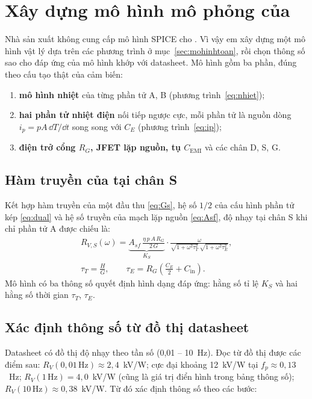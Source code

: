 \section{Xây dựng mô hình mô phỏng của \PYD{}}
\label{sec:mohinh}

Nhà sản xuất không cung cấp mô hình SPICE cho \PYD{}. Vì vậy em xây dựng một mô hình vật lý dựa trên các phương trình ở mục~\ref{sec:mohinhtoan}, rồi chọn thông số sao cho đáp ứng của mô hình khớp với datasheet. Mô hình gồm ba phần, đúng theo cấu tạo thật của cảm biến:
\begin{enumerate}
  \item \textbf{mô hình nhiệt} của từng phần tử A, B (phương trình~\eqref{eq:nhiet});
  \item \textbf{hai phần tử nhiệt điện} nối tiếp ngược cực, mỗi phần tử là nguồn dòng $i_p = pA\,\dd T/\dd t$ song song với $C_E$ (phương trình~\eqref{eq:ip});
  \item \textbf{điện trở cổng $R_G$, JFET lặp nguồn, tụ $C_\text{EMI}$} và các chân D, S, G.
\end{enumerate}

\subsection{Hàm truyền của \PYD{} tại chân S}

Kết hợp hàm truyền của một đầu thu \eqref{eq:Gs}, hệ số $1/2$ của cấu hình phần tử kép \eqref{eq:dual} và hệ số truyền của mạch lặp nguồn \eqref{eq:Asf}, độ nhạy tại chân S khi chỉ phần tử A được chiếu là:
\begin{gather}
  R_{V,S}(\omega) = \underbrace{A_{sf}\,\frac{\eta\,p\,A\,R_G}{2\,G}}_{K_S}\cdot
  \frac{\omega}{\sqrt{1+\omega^2\tau_T^2}\,\sqrt{1+\omega^2\tau_E^2}}, \label{eq:RVS}\\
  \tau_T = \frac{H}{G},\qquad \tau_E = R_G\left(\frac{C_E}{2}+C_\text{in}\right). \nonumber
\end{gather}
Mô hình có ba thông số quyết định hình dạng đáp ứng: hằng số tỉ lệ $K_S$ và hai hằng số thời gian $\tau_T$, $\tau_E$.

\subsection{Xác định thông số từ đồ thị datasheet}

Datasheet \PYD{} \cite{pyd1378-ds} có đồ thị độ nhạy theo tần số (0,01 -- 10~Hz). Đọc từ đồ thị được các điểm sau: $R_V(0{,}01\,\text{Hz}) \approx 2{,}4$~kV/W; cực đại khoảng 12~kV/W tại $f_p \approx 0{,}13$~Hz; $R_V(1\,\text{Hz}) = 4{,}0$~kV/W (cũng là giá trị điển hình trong bảng thông số); $R_V(10\,\text{Hz}) \approx 0{,}38$~kV/W. Từ đó xác định thông số theo các bước:

